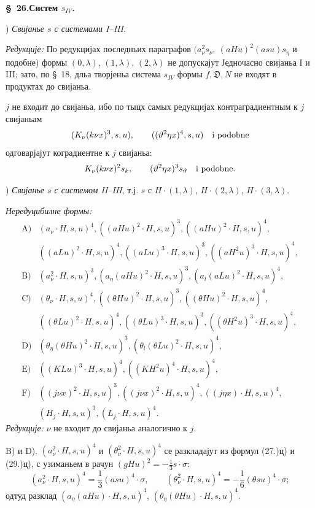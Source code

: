 ﻿\documentclass[11pt]{article}
\newcommand{\D}{\mathfrak D}
\begin{document}
\begin{center}
\textbf{\S\ 26.\quad Систем $s_{IV}$.}
\end{center}
) \textit{Свијанье $s$ с системами I--III.}

\noindent\textit{Редукције:} По редукцијах последньих параграфов $(a_\nu^2s_\nu,\ (aHu)^2(asu)s_\eta$ и подобне) формы $(0,\lambda)$, $(1,\lambda)$, $(2,\lambda)$ не допускајут Једночасно свијаньа I и III; зато, по \S\ 18, дльа творјеньа система $s_{IV}$ формы $f,\D,N$ не входят в продуктах до свијаньа.

$j$ не входит до свијаньа, ибо по тыцх самых редукцијах контраградиентным к $j$ свијаньам
\[
(K_\nu(k\nu x)^3,s,u),\qquad ((\vartheta^2\eta x)^4,s,u)\quad\hbox{i podobne}
\]
одговарјајут коградиентне к $j$ свијаньа:
\[
K_\nu(k\nu x)^2s_k,
\qquad (\vartheta^2\eta x)^3s_\vartheta\quad\hbox{i podobne}.
\]

) \textit{Свијанье $s$ с системом II--III}, т.ј. $s$ с $H\cdot(1,\lambda)$, $H\cdot(2,\lambda)$, $H\cdot(3,\lambda)$.

\noindent\textit{Нередуцибилне формы:}
\[
\begin{array}{rl}
\mbox{A)}&(a_\nu\cdot H,s,u)^4,
((aHu)^2\cdot H,s,u)^3,
((aHu)^2\cdot H,s,u)^4,\\[0.25em]
&((aLu)^2\cdot H,s,u)^4,
((aLu)^3\cdot H,s,u)^3,
((aH^2u)^3\cdot H,s,u)^4,\\[0.45em]
\mbox{B)}&(a_\nu^2\cdot H,s,u)^3,
(a_\eta(aHu)^2\cdot H,s,u)^3,
(a_l(aLu)^2\cdot H,s,u)^4,\\[0.45em]
\mbox{C)}&(\theta_\nu\cdot H,s,u)^4,
((\theta Hu)^2\cdot H,s,u)^3,
((\theta Hu)^2\cdot H,s,u)^4,\\[0.25em]
&((\theta Lu)^2\cdot H,s,u)^4,
((\theta Lu)^3\cdot H,s,u)^3,
((\theta H^2u)^3\cdot H,s,u)^4,\\[0.45em]
\mbox{D)}&(\theta_\eta(\theta Hu)^2\cdot H,s,u)^3,
(\theta_l(\theta Lu)^2\cdot H,s,u)^4,\\[0.45em]
\mbox{E)}&((KLu)^3\cdot H,s,u)^4,
((KH^2u)^4\cdot H,s,u)^4,\\[0.45em]
\mbox{F)}&((j\nu x)^2\cdot H,s,u)^3,
((j\nu x)^2\cdot H,s,u)^4,
((j\eta x)\cdot H,s,u)^4,\\[0.25em]
&(H_j\cdot H,s,u)^3,
(L_j\cdot H,s,u)^4.
\end{array}
\]
\noindent\textit{Редукције:} $\nu$ не входит до свијаньа аналогично к $j$.

\mbox{B)} и \mbox{D)}. $(a_\nu^2\cdot H,s,u)^4$ и $(\theta_\nu^2\cdot H,s,u)^4$ се разкладајут из формул (27.)ц) и (29.)ц), с узиманьем в рачун $(gHu)^2=-\frac13s\cdot\sigma$:
\[
(a_\nu^2\cdot H,s,u)^4=\frac13(asu)^4\cdot\sigma,
\qquad
(\theta_\nu^2\cdot H,s,u)^4=-\frac16(\theta su)^4\cdot\sigma;
\]
одтуд разклад $(a_\eta(aHu)\cdot H,s,u)^4$, $(\theta_\eta(\theta Hu)\cdot H,s,u)^4$.
\end{document}
